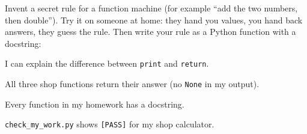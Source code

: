 \begin{creative}
Invent a secret rule for a function machine (for example \enquote{add the two numbers, then double}). Try it on someone at home:
they hand you values, you hand back answers, they guess the rule. Then write your rule as a Python function with a docstring:
\answerspace{3.5cm}
\end{creative}

\begin{selfcheck}
  \item I can explain the difference between \texttt{print} and \texttt{return}.
  \item All three shop functions return their answer (no \texttt{None} in my output).
  \item Every function in my homework has a docstring.
  \item \texttt{check\_my\_work.py} shows \texttt{[PASS]} for my shop calculator.
\end{selfcheck}
